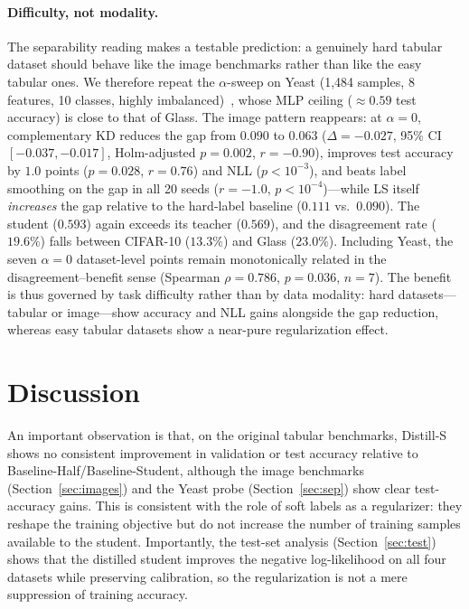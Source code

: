 \documentclass[a4paper,fleqn]{cas-dc}
\begin{document}
\paragraph{Difficulty, not modality.}
The separability reading makes a testable prediction: a genuinely hard
tabular dataset should behave like the image benchmarks rather than like
the easy tabular ones. We therefore repeat the $\alpha$-sweep on Yeast
(1{,}484 samples, 8 features, 10 classes, highly
imbalanced)~\citep{yeast}, whose MLP ceiling ($\approx 0.59$ test
accuracy) is close to that of Glass. The image pattern reappears: at
$\alpha{=}0$, complementary KD reduces the gap from $0.090$ to $0.063$
($\Delta{=}-0.027$, 95\% CI $[-0.037,-0.017]$, Holm-adjusted $p{=}0.002$,
$r{=}-0.90$), improves test accuracy by $1.0$ points ($p{=}0.028$,
$r{=}0.76$) and NLL ($p{<}10^{-3}$), and beats label smoothing on the
gap in all 20 seeds ($r{=}-1.0$, $p{<}10^{-4}$)---while LS itself
\emph{increases} the gap relative to the hard-label baseline ($0.111$
vs.\ $0.090$). The student ($0.593$) again exceeds its teacher
($0.569$), and the disagreement rate ($19.6\%$) falls between CIFAR-10
($13.3\%$) and Glass ($23.0\%$). Including Yeast, the seven
$\alpha{=}0$ dataset-level points remain monotonically related in the
disagreement--benefit sense (Spearman $\rho{=}0.786$, $p{=}0.036$,
$n{=}7$). The benefit is thus governed by task difficulty rather than by
data modality: hard datasets---tabular or image---show accuracy and NLL
gains alongside the gap reduction, whereas easy tabular datasets show a
near-pure regularization effect.



\section{Discussion}

An important observation is that, on the original tabular benchmarks, Distill-S shows no consistent improvement in validation or test accuracy relative to Baseline-Half/Baseline-Student, although the image benchmarks (Section~\ref{sec:images}) and the Yeast probe (Section~\ref{sec:sep}) show clear test-accuracy gains. This is consistent with the role of soft labels as a regularizer: they reshape the training objective but do not increase the number of training samples available to the student. Importantly, the test-set analysis (Section~\ref{sec:test}) shows that the distilled student improves the negative log-likelihood on all four datasets while preserving calibration, so the regularization is not a mere suppression of training accuracy.
\end{document}
